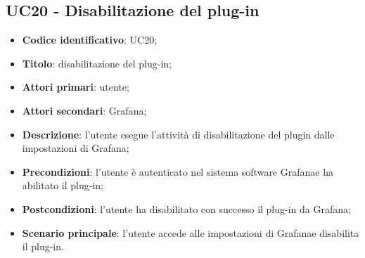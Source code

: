 \subsection{UC20 - Disabilitazione del plug-in}
\begin{itemize}
	\item \textbf{Codice identificativo}: UC20;
	\item \textbf{Titolo}: disabilitazione del plug-in;
	\item \textbf{Attori primari}: utente;
	\item \textbf{Attori secondari}: Grafana\glo;
	\item \textbf{Descrizione}: l'utente esegue l'attività di disabilitazione del plugin dalle impostazioni di Grafana\glo;
	\item \textbf{Precondizioni}: l'utente è autenticato nel sistema software Grafana\glosp e ha abilitato il plug-in;
	\item \textbf{Postcondizioni}: l'utente ha disabilitato con successo il plug-in da Grafana\glo;
	\item \textbf{Scenario principale}: l'utente accede alle impostazioni di Grafana\glosp e disabilita il plug-in.
\end{itemize}